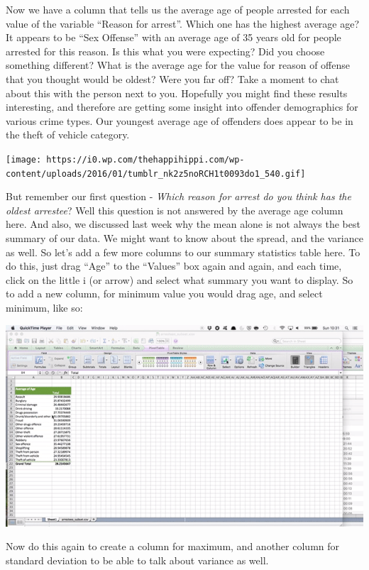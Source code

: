 \documentclass[
]{book}
\begin{document}
Now we have a column that tells us the average age of people arrested for each value of the variable ``Reason for arrest''. Which one has the highest average age? It appears to be ``Sex Offense'' with an average age of 35 years old for people arrested for this reason. Is this what you were expecting? Did you choose something different? What is the average age for the value for reason of offense that you thought would be oldest? Were you far off? Take a moment to chat about this with the person next to you. Hopefully you might find these results interesting, and therefore are getting some insight into offender demographics for various crime types. Our youngest average age of offenders does appear to be in the theft of vehicle category.

\texttt{[image: https://i0.wp.com/thehappihippi.com/wp-content/uploads/2016/01/tumblr\_nk2z5noRCH1t0093do1\_540.gif]}

But remember our first question - \emph{Which reason for arrest do you think has the oldest arrestee}? Well this question is not answered by the average age column here. And also, we discussed last week why the mean alone is not always the best summary of our data. We might want to know about the spread, and the variance as well. So let's add a few more columns to our summary statistics table here. To do this, just drag ``Age'' to the ``Values'' box again and again, and each time, click on the little i (or arrow) and select what summary you want to display. So to add a new column, for minimum value you would drag age, and select minimum, like so:

\includegraphics{imgs/make_min_col.gif}

Now do this again to create a column for maximum, and another column for standard deviation to be able to talk about variance as well.
\end{document}
